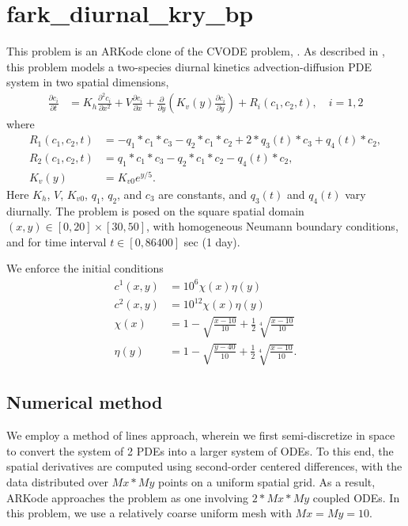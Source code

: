\documentclass[letterpaper,10pt,english]{sphinxmanual}
\begin{document}
\section{fark\_diurnal\_kry\_bp}
\label{\detokenize{f77_serial:fark-diurnal-kry-bp}}\label{\detokenize{f77_serial:id1}}
This problem is an ARKode clone of the CVODE problem,
.  As described in \label{\detokenize{f77_serial:id2}}{\hyperref[\detokenize{References:hsr2017}]{\sphinxcrossref{{[}HSR2017{]}}}}, this problem
models a two-species diurnal kinetics advection-diffusion PDE system
in two spatial dimensions,
\begin{equation*}
\begin{split}\frac{\partial c_i}{\partial t} &=
  K_h \frac{\partial^2 c_i}{\partial x^2} +
  V \frac{\partial     c_i}{\partial x} +
  \frac{\partial}{\partial y}\left( K_v(y)
  \frac{\partial c_i}{\partial y}\right) +
  R_i(c_1,c_2,t),\quad i=1,2\end{split}
\end{equation*}
where
\begin{equation*}
\begin{split}R_1(c_1,c_2,t) &= -q_1*c_1*c_3 - q_2*c_1*c_2 + 2*q_3(t)*c_3 + q_4(t)*c_2, \\
R_2(c_1,c_2,t) &=  q_1*c_1*c_3 - q_2*c_1*c_2 - q_4(t)*c_2, \\
K_v(y) &= K_{v0} e^{y/5}.\end{split}
\end{equation*}
Here \(K_h\), \(V\), \(K_{v0}\), \(q_1\), \(q_2\),
and \(c_3\) are constants, and \(q_3(t)\) and \(q_4(t)\)
vary diurnally.  The problem is posed on the square spatial domain
\((x,y) \in [0,20]\times[30,50]\), with homogeneous Neumann
boundary conditions, and for time interval \(t\in [0,86400]\) sec
(1 day).

We enforce the initial conditions
\begin{equation*}
\begin{split}c^1(x,y) &=  10^6 \chi(x)\eta(y) \\
c^2(x,y) &=  10^{12} \chi(x)\eta(y) \\
\chi(x) &= 1 - \sqrt{\frac{x - 10}{10}} + \frac12 \sqrt[4]{\frac{x - 10}{10}} \\
\eta(y) &= 1 - \sqrt{\frac{y - 40}{10}} + \frac12 \sqrt[4]{\frac{x - 10}{10}}.\end{split}
\end{equation*}

\subsection{Numerical method}
\label{\detokenize{f77_serial:numerical-method}}
We employ a method of lines approach, wherein we first semi-discretize
in space to convert the system of 2 PDEs into a larger system of ODEs.
To this end, the spatial derivatives are computed using second-order
centered differences, with the data distributed over \(Mx*My\)
points on a uniform spatial grid.  As a result, ARKode approaches the
problem as one involving \(2*Mx*My\) coupled ODEs. In this
problem, we use a relatively coarse uniform mesh with
\(Mx=My=10\).
\end{document}
